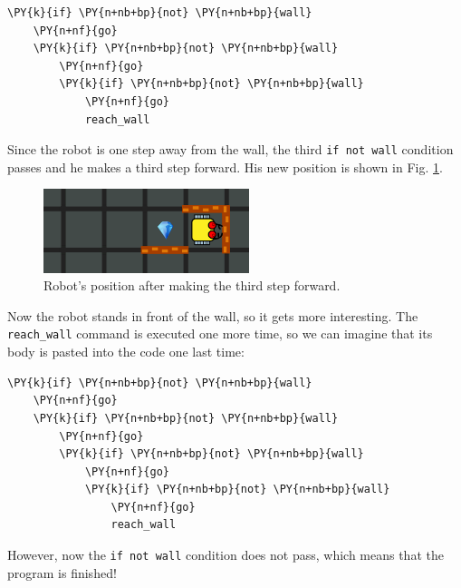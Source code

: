 \begin{bbox}
\begin{Verbatim}[commandchars=\\\{\}]
\PY{k}{if} \PY{n+nb+bp}{not} \PY{n+nb+bp}{wall}
    \PY{n+nf}{go}
    \PY{k}{if} \PY{n+nb+bp}{not} \PY{n+nb+bp}{wall}
        \PY{n+nf}{go}
        \PY{k}{if} \PY{n+nb+bp}{not} \PY{n+nb+bp}{wall}
            \PY{n+nf}{go}
            reach_wall
\end{Verbatim}
\end{bbox}
\vspace{6mm}

\noindent
Since the robot is one step away from the wall, the third {\tt if not wall} condition passes and 
he makes a third step forward. His new position is shown in Fig. \ref{fig:rec4}.

\begin{figure}[!ht]
\begin{center}
\includegraphics[width=6cm]{img/rec-4.png}
\end{center}
\vspace{-4mm}
\caption{Robot's position after making the third step forward.}
\label{fig:rec4}
\end{figure}
\noindent
Now the robot stands in front of the wall, so it gets more interesting. The 
{\tt reach\_wall} command is executed one more time, so we can imagine that its body 
is pasted into the code one last time:\\

\begin{bbox}
\begin{Verbatim}[commandchars=\\\{\}]
\PY{k}{if} \PY{n+nb+bp}{not} \PY{n+nb+bp}{wall}
    \PY{n+nf}{go}
    \PY{k}{if} \PY{n+nb+bp}{not} \PY{n+nb+bp}{wall}
        \PY{n+nf}{go}
        \PY{k}{if} \PY{n+nb+bp}{not} \PY{n+nb+bp}{wall}
            \PY{n+nf}{go}
            \PY{k}{if} \PY{n+nb+bp}{not} \PY{n+nb+bp}{wall}
                \PY{n+nf}{go}
                reach_wall
\end{Verbatim}
\end{bbox}
\vspace{6mm}

\noindent
However, now the {\tt if not wall} condition does not pass, which means that  
the program is finished!


